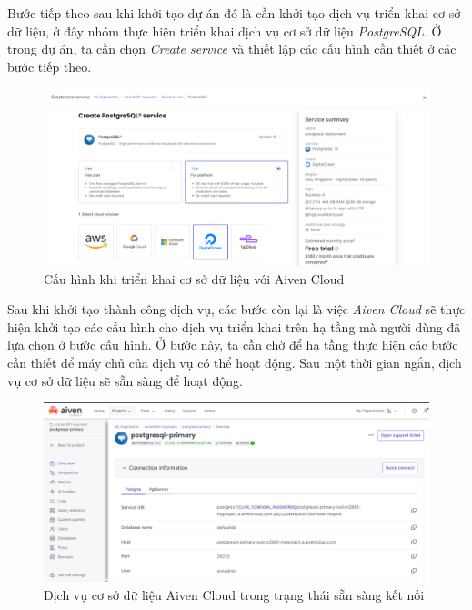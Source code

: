 \hspace*{1cm}
Bước tiếp theo sau khi khởi tạo dự án đó là cần khởi tạo dịch vụ triển khai cơ sở dữ liệu, ở đây nhóm thực hiện triển khai dịch vụ cơ sở dữ liệu \textit{PostgreSQL}. Ở trong dự án, ta cần chọn \textit{Create service} và thiết lập các cấu hình cần thiết ở các bước tiếp theo.
\begin{figure}[H]
    \centering
    \includegraphics[width=1\textwidth]{Images/Deployment/Database/AivenConfiguration.png}
    \caption{Cấu hình khi triển khai cơ sở dữ liệu với Aiven Cloud}
\end{figure}
\hspace*{1cm}
Sau khi khởi tạo thành công dịch vụ, các bước còn lại là việc \textit{Aiven Cloud} sẽ thực hiện khởi tạo các cấu hình cho dịch vụ triển khai trên hạ tầng mà người dùng đã lựa chọn ở bước cấu hình. Ở bước này, ta cần chờ để hạ tầng thực hiện các bước cần thiết để máy chủ của dịch vụ có thể hoạt động. Sau một thời gian ngắn, dịch vụ cơ sở dữ liệu sẽ sẵn sàng để hoạt động.
\begin{figure}[H]
    \centering
    \includegraphics[width=1\textwidth]{Images/Deployment/Database/AivenRunning.png}
    \caption{Dịch vụ cơ sở dữ liệu Aiven Cloud trong trạng thái sẵn sàng kết nối}
\end{figure}
\hspace*{1cm}
